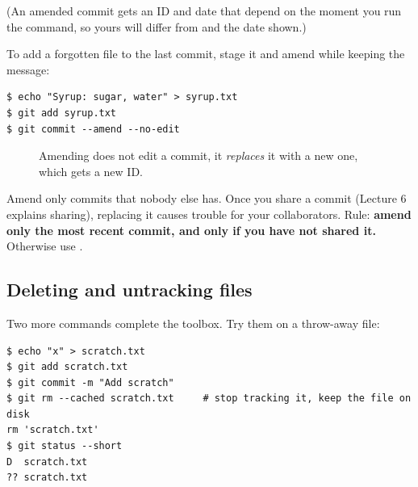 (An amended commit gets an ID and date that depend on the moment you run the command, so yours will differ from  and the date shown.)

To add a forgotten file to the last commit, stage it and amend while keeping the message:

\begin{lstlisting}
$ echo "Syrup: sugar, water" > syrup.txt
$ git add syrup.txt
$ git commit --amend --no-edit
\end{lstlisting}

\begin{figure}[H]
\centering
{}
\caption{Amending does not edit a commit, it \emph{replaces} it with a new one, which gets a new ID.}
\label{fig:amend}
\end{figure}

\begin{pitfall}
Amend only commits that nobody else has. Once you share a commit (Lecture 6 explains sharing), replacing it causes trouble for your collaborators. Rule: \textbf{amend only the most recent commit, and only if you have not shared it.} Otherwise use .
\end{pitfall}

\subsection{Deleting and untracking files}

Two more commands complete the toolbox. Try them on a throw-away file:

\begin{lstlisting}
$ echo "x" > scratch.txt
$ git add scratch.txt
$ git commit -m "Add scratch"
$ git rm --cached scratch.txt     # stop tracking it, keep the file on disk
rm 'scratch.txt'
$ git status --short
D  scratch.txt
?? scratch.txt
\end{lstlisting}

